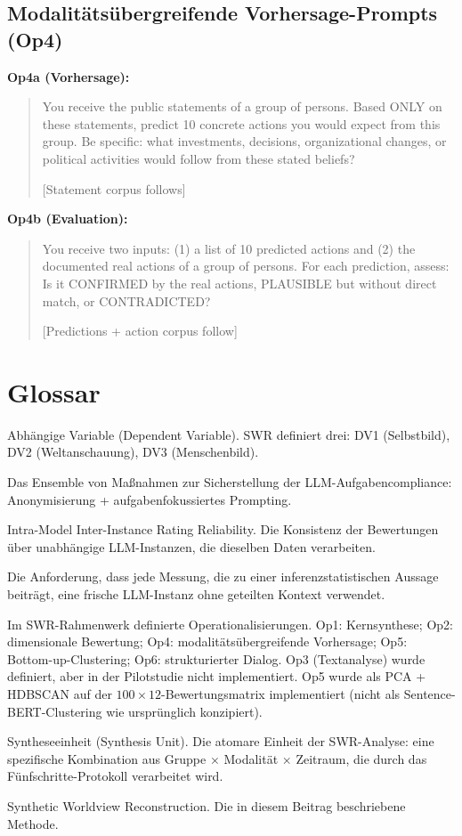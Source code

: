 \documentclass[11pt,a4paper]{article}
\newenvironment{promptquote}{%
  \begin{quote}\footnotesize\ttfamily\raggedright\sloppy
}{%
  \end{quote}
}
\begin{document}
\subsection{Modalitätsübergreifende Vorhersage-Prompts (Op4)}

\textbf{Op4a (Vorhersage):}
\begin{promptquote}
You receive the public statements of a group of persons. Based ONLY on these statements, predict 10 concrete actions you would expect from this group. Be specific: what investments, decisions, organizational changes, or political activities would follow from these stated beliefs?

[Statement corpus follows]
\end{promptquote}

\textbf{Op4b (Evaluation):}
\begin{promptquote}
You receive two inputs: (1) a list of 10 predicted actions and (2) the documented real actions of a group of persons. For each prediction, assess: Is it CONFIRMED by the real actions, PLAUSIBLE but without direct match, or CONTRADICTED?

[Predictions + action corpus follow]
\end{promptquote}


\section{Glossar}
\label{app:glossary}

\begin{description}[style=nextline, leftmargin=2cm]
  \item[DV] Abhängige Variable (Dependent Variable). SWR definiert drei: DV1 (Selbstbild), DV2 (Weltanschauung), DV3 (Menschenbild).
  \item[Fokuskontrolle (Focus Control)] Das Ensemble von Maßnahmen zur Sicherstellung der LLM-Aufgabencompliance: Anonymisierung + aufgabenfokussiertes Prompting.
  \item[IMIIRR] Intra-Model Inter-Instance Rating Reliability. Die Konsistenz der Bewertungen über unabhängige LLM-Instanzen, die dieselben Daten verarbeiten.
  \item[Instance Separation] Die Anforderung, dass jede Messung, die zu einer inferenzstatistischen Aussage beiträgt, eine frische LLM-Instanz ohne geteilten Kontext verwendet.
  \item[Op1--Op6] Im SWR-Rahmenwerk definierte Operationalisierungen. Op1: Kernsynthese; Op2: dimensionale Bewertung; Op4: modalitätsübergreifende Vorhersage; Op5: Bottom-up-Clustering; Op6: strukturierter Dialog. Op3 (Textanalyse) wurde definiert, aber in der Pilotstudie nicht implementiert. Op5 wurde als PCA + HDBSCAN auf der $100 \times 12$-Bewertungsmatrix implementiert (nicht als Sentence-BERT-Clustering wie ursprünglich konzipiert).
  \item[SE] Syntheseeinheit (Synthesis Unit). Die atomare Einheit der SWR-Analyse: eine spezifische Kombination aus Gruppe $\times$ Modalität $\times$ Zeitraum, die durch das Fünfschritte-Protokoll verarbeitet wird.
  \item[SWR] Synthetic Worldview Reconstruction. Die in diesem Beitrag beschriebene Methode.
\end{description}
\end{document}
